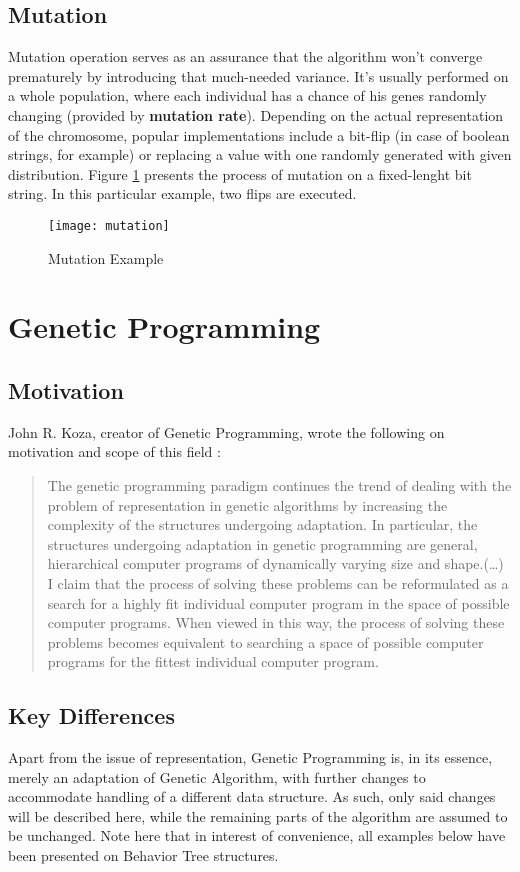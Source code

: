 \subsection{Mutation}
Mutation operation serves as an assurance that the algorithm won't converge prematurely by introducing that much-needed variance. It's usually performed on a whole population, where each individual has a chance of his genes randomly changing (provided by \textbf{mutation rate}). Depending on the actual representation of the chromosome, popular implementations include a bit-flip (in case of boolean strings, for example) or replacing a value with one randomly generated with given distribution. Figure \ref{fig:x mutationexample} presents the process of mutation on a fixed-lenght bit string. In this particular example, two flips are executed.
\begin{figure}[h]
    \centering
    \texttt{[image: mutation]}
    \caption{Mutation Example}
    \label{fig:x mutationexample}
\end{figure}
\section{Genetic Programming}
\subsection{Motivation}
John R. Koza, creator of Genetic Programming, wrote the following on motivation and scope of this field \cite{kozagp}:
\begin{quote}
    The genetic programming paradigm continues the trend of dealing with the problem of representation in genetic algorithms by increasing the complexity of the structures undergoing adaptation. In particular, the structures undergoing adaptation in genetic programming are general, hierarchical computer programs of dynamically varying size and shape.(\ldots)
    I claim that the process of solving these problems can be reformulated as a search for a highly fit individual computer program in the space of possible computer programs. When viewed in this way, the process of solving these problems becomes equivalent to searching a space of possible computer programs for the fittest individual computer program.
\end{quote}

\subsection{Key Differences}
Apart from the issue of representation, Genetic Programming is, in its essence, merely an adaptation of Genetic Algorithm, with further changes to accommodate handling of a different data structure. As such, only said changes will be described here, while the remaining parts of the algorithm are assumed to be unchanged. Note here that in interest of convenience, all examples below have been presented on Behavior Tree structures.
